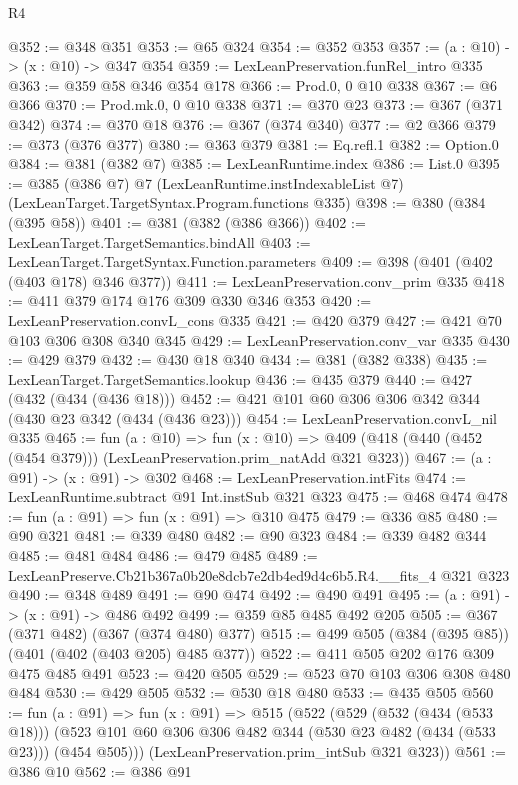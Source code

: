 \begin{lexlean}{R4}
\begin{coremodule}
@352 := @348 @351
@353 := @65 @324
@354 := @352 @353
@357 := (a : @10) -> (x : @10) -> @347 @354
@359 := LexLeanPreservation.funRel_intro @335
@363 := @359 @58 @346 @354 @178
@366 := Prod.{0, 0} @10 @338
@367 := @6 @366
@370 := Prod.mk.{0, 0} @10 @338
@371 := @370 @23
@373 := @367 (@371 @342)
@374 := @370 @18
@376 := @367 (@374 @340)
@377 := @2 @366
@379 := @373 (@376 @377)
@380 := @363 @379
@381 := Eq.refl.{1}
@382 := Option.{0}
@384 := @381 (@382 @7)
@385 := LexLeanRuntime.index
@386 := List.{0}
@395 := @385
    (@386 @7)
    @7
    (LexLeanRuntime.instIndexableList @7)
    (LexLeanTarget.TargetSyntax.Program.functions @335)
@398 := @380 (@384 (@395 @58))
@401 := @381 (@382 (@386 @366))
@402 := LexLeanTarget.TargetSemantics.bindAll
@403 := LexLeanTarget.TargetSyntax.Function.parameters
@409 := @398 (@401 (@402 (@403 @178) @346 @377))
@411 := LexLeanPreservation.conv_prim @335
@418 := @411 @379 @174 @176 @309 @330 @346 @353
@420 := LexLeanPreservation.convL_cons @335
@421 := @420 @379
@427 := @421 @70 @103 @306 @308 @340 @345
@429 := LexLeanPreservation.conv_var @335
@430 := @429 @379
@432 := @430 @18 @340
@434 := @381 (@382 @338)
@435 := LexLeanTarget.TargetSemantics.lookup
@436 := @435 @379
@440 := @427 (@432 (@434 (@436 @18)))
@452 := @421 @101 @60 @306 @306 @342 @344 (@430 @23 @342 (@434 (@436 @23)))
@454 := LexLeanPreservation.convL_nil @335
@465 := fun (a : @10) =>
  fun (x : @10) => @409 (@418 (@440 (@452 (@454 @379))) (LexLeanPreservation.prim_natAdd @321 @323))
@467 := (a : @91) -> (x : @91) -> @302
@468 := LexLeanPreservation.intFits
@474 := LexLeanRuntime.subtract @91 Int.instSub @321 @323
@475 := @468 @474
@478 := fun (a : @91) => fun (x : @91) => @310 @475
@479 := @336 @85
@480 := @90 @321
@481 := @339 @480
@482 := @90 @323
@484 := @339 @482 @344
@485 := @481 @484
@486 := @479 @485
@489 := LexLeanPreserve.Cb21b367a0b20e8dcb7e2db4ed9d4c6b5.R4.__fits_4 @321 @323
@490 := @348 @489
@491 := @90 @474
@492 := @490 @491
@495 := (a : @91) -> (x : @91) -> @486 @492
@499 := @359 @85 @485 @492 @205
@505 := @367 (@371 @482) (@367 (@374 @480) @377)
@515 := @499 @505 (@384 (@395 @85)) (@401 (@402 (@403 @205) @485 @377))
@522 := @411 @505 @202 @176 @309 @475 @485 @491
@523 := @420 @505
@529 := @523 @70 @103 @306 @308 @480 @484
@530 := @429 @505
@532 := @530 @18 @480
@533 := @435 @505
@560 := fun (a : @91) =>
  fun (x : @91) =>
  @515
    (@522
      (@529
        (@532 (@434 (@533 @18)))
        (@523 @101 @60 @306 @306 @482 @344 (@530 @23 @482 (@434 (@533 @23))) (@454 @505)))
      (LexLeanPreservation.prim_intSub @321 @323))
@561 := @386 @10
@562 := @386 @91

\end{coremodule}
\end{lexlean}
